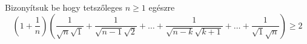 Bizonyítsuk be hogy tetszőleges $n\ge 1$ egészre 
$$
{\left( 1+\frac{1}{n} \right) }
{\left( \frac{1}{\sqrt{n}\sqrt{1}}+\frac{1}{\sqrt{n-1}\sqrt{2}}+
\hdots+\frac{1}{\sqrt{n-k}\sqrt{k+1}}+\hdots+ \frac{1}{\sqrt{1}\sqrt{n}} \right) }
\ge 2
$$
